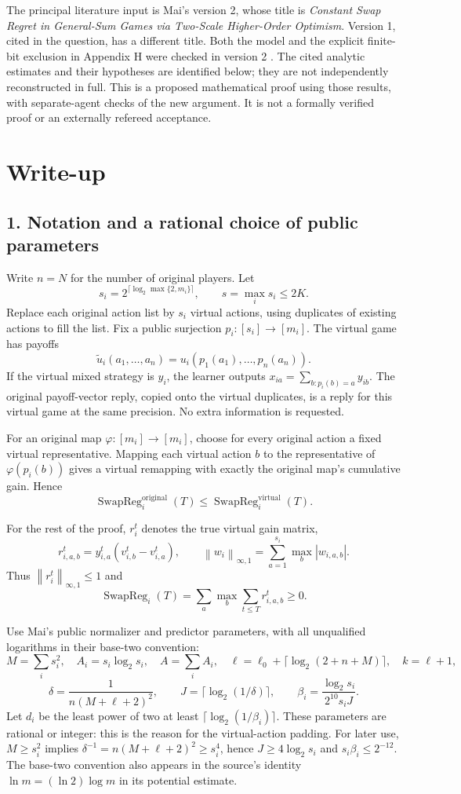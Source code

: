 \documentclass[11pt]{article}
\newcommand{\SwapReg}{\operatorname{SwapReg}}
\newcommand{\norm}[1]{\left\lVert#1\right\rVert}
\newcommand{\rn}[1]{\norm{#1}_{\infty,1}}
\begin{document}
The principal literature input is Mai's version 2, whose title is
\emph{Constant Swap Regret in General-Sum Games via Two-Scale Higher-Order
Optimism}.  Version 1, cited in the question, has a different title.
Both the model and the explicit finite-bit exclusion in Appendix H were
checked in version 2 \cite{mai}.  The cited analytic estimates and
their hypotheses are identified below; they are not independently
reconstructed in full.  This is a proposed mathematical proof using
those results, with separate-agent checks of the new argument.  It is
not a formally verified proof or an externally refereed acceptance.

\section*{Write-up}
\subsection*{1. Notation and a rational choice of public parameters}
Write $n=N$ for the number of original players.  Let
\[
 s_i=2^{\lceil\log_2\max\{2,m_i\}\rceil},\qquad s=\max_i s_i\leq2K.
\]
Replace each original action list by $s_i$ virtual actions, using
duplicates of existing actions to fill the list.  Fix a public
surjection $p_i:[s_i]\to[m_i]$.  The virtual game has payoffs
\[
 \widetilde u_i(a_1,\ldots,a_n)
 =u_i(p_1(a_1),\ldots,p_n(a_n)).
\]
If the virtual mixed strategy is $y_i$, the learner outputs
$x_{ia}=\sum_{b:p_i(b)=a}y_{ib}$.  The original payoff-vector reply,
copied onto the virtual duplicates, is a reply for this virtual game
at the same precision.  No extra information is requested.

For an original map $\varphi:[m_i]\to[m_i]$, choose for every original
action a fixed virtual representative.  Mapping each virtual action
$b$ to the representative of $\varphi(p_i(b))$ gives a virtual
remapping with exactly the original map's cumulative gain.  Hence
\begin{equation}\label{eq:padding}
 \SwapReg_i^{\mathrm{original}}(T)
 \leq\SwapReg_i^{\mathrm{virtual}}(T).
\end{equation}

For the rest of the proof, $r_i^t$ denotes the true virtual gain matrix,
\[
 r_{i,a,b}^t=y_{i,a}^t
 (v_{i,b}^t-v_{i,a}^t),\qquad
 \rn{w_i}=\sum_{a=1}^{s_i}\max_b|w_{i,a,b}|.
\]
Thus $\rn{r_i^t}\leq1$ and
\[
 \SwapReg_i(T)=\sum_a\max_b\sum_{t\leq T}r_{i,a,b}^t\geq0.
\]

Use Mai's public normalizer and predictor parameters, with all
unqualified logarithms in their base-two convention:
\[
 M=\sum_i s_i^2,\quad A_i=s_i\log_2s_i,\quad A=\sum_iA_i,
 \quad\ell=\ell_0+\lceil\log_2(2+n+M)\rceil,\quad k=\ell+1,
\]
\[
 \delta=\frac1{n(M+\ell+2)^2},\qquad
 J=\lceil\log_2(1/\delta)\rceil,\qquad
 \beta_i=\frac{\log_2s_i}{2^{10}s_iJ}.
\]
Let $d_i$ be the least power of two at least
$\lceil\log_2(1/\beta_i)\rceil$.  These parameters are rational or
integer: this is the reason for the virtual-action padding.
For later use, $M\geq s_i^2$ implies
$\delta^{-1}=n(M+\ell+2)^2\geq s_i^4$, hence
$J\geq4\log_2s_i$ and $s_i\beta_i\leq2^{-12}$.
The base-two convention also appears in the source's identity
$\ln m=(\ln2)\log m$ in its potential estimate.
\end{document}

